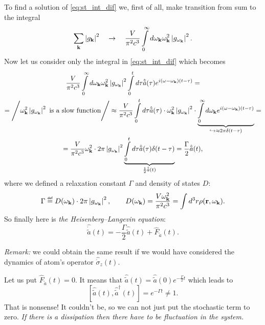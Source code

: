 To find a solution of \eqref{eq:st_int_dif} we, first of all, make transition from sum to the integral
\begin{equation}
	\sum_{\mathbf{k}} \left| g_{\mathbf{k}} \right|^2 \quad \to \quad \frac{V}{\pi^2 c^3} \int \limits_0^{\infty} d \omega_{\mathbf{k}} \omega_{\mathbf{k}}^2 \left| g_{\omega_{\mathbf{k}}} \right|^2.
\end{equation}
Now let us consider only the integral in \eqref{eq:st_int_dif} which becomes
\begin{multline}
	\frac{V}{\pi^2 c^3} \int \limits_0^{\infty} d \omega_{\mathbf{k}} \omega_{\mathbf{k}}^2 \left| g_{\omega_{\mathbf{k}}} \right|^2 \int \limits_0^t d\tau \hat{\tilde{a}}(\tau)e^{i(\omega - \omega_{\mathbf{k}})(t - \tau)} = \\ =\Bigg/ \omega_{\mathbf{k}}^2 \left| g_{\omega_{\mathbf{k}}} \right|^2 \text{ is a slow function} \Bigg/
	\approx \frac{V}{\pi^2 c^3} \int \limits_0^t d \tau \hat{\tilde{a}}(\tau) \cdot \omega_{\mathbf{k}}^2 \left| g_{\omega_{\mathbf{k}}} \right|^2 \cdot  \underbrace{\int \limits_0^{\infty} d \omega_{\mathbf{k}} e^{i(\omega - \omega_{\mathbf{k}})(t - \tau)}}_{\hookrightarrow\approx 2\pi \delta(t - \tau)} =\\= \frac{V}{\pi^2 c^3} \omega_{\mathbf{k}}^2 \cdot 2 \pi \left| g_{\omega_{\mathbf{k}}} \right|^2 \underbrace{\int \limits_0^t d\tau \hat{\tilde{a}}(\tau) \delta(t - \tau)}_{\frac{1}{2} \hat{\tilde{a}}(t)}  =\frac{\Gamma}{2}\hat{\tilde{a}}(t),
\end{multline}
where we defined a relaxation constant $\Gamma$ and density of states $D$:
\begin{equation}
	\Gamma \myeq D(\omega_{\kv}) \cdot 2 \pi \left| g_{\omega_{\kv}} \right|^2  , \qquad D(\omega_{\kv}) = \frac{V \omega_{\kv}^2}{\pi^2 c^3} = \int d^3 r \rho(\vec{r}, \omega_{\kv}).
\end{equation}
So finally here is \textit{the Heisenberg--Langevin equation}:
\begin{equation}
	\boxed{\hat{\dot{\tilde{a}}}(t) = - \frac{\Gamma}{2} \hat{\tilde{a}}(t) + \hat{F}_{\tilde{a}} (t). }
	\label{eq:HLeq}
\end{equation}

\textit{Remark:} we could obtain the same result if we would have considered the dynamics of atom's operator $\hat{\dot{\sigma}}_z(t)$.

\begin{testexample}
	Let us put $\hat{F}_{\tilde{a}} (t) = 0$. It means that $\hat{\tilde{a}}(t) = \hat{\tilde{a}}(0) e^{- \frac{\Gamma}{2} t}$ which leads to
	\begin{equation}
		\left[ \hat{\tilde{a}}(t), \hat{\tilde{a}}^{\dagger}(t) \right] = e^{- \Gamma t} \neq 1.
		\label{eq:example}
	\end{equation}
	That is nonsense! It couldn’t be, so we can not just put the stochastic term to zero. \textit{If there is a dissipation then there have to be fluctuation in the system.}
\end{testexample}





